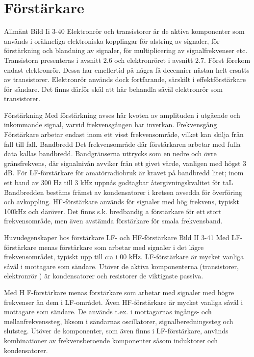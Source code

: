 \section{Förstärkare}

Allmänt
Bild Ii 3-40
Elektronrör och transistorer är de aktiva komponenter som används i oräkneliga elektroniska kopplingar för alstring av signaler, för
förstärkning och blandning av signaler, för
multiplicering av signalfrekvenser etc.
Transistorn presenteras i avsnitt 2.6 och
elektronröret i avsnitt 2.7.
Först förekom endast elektronrör. Dessa
har emellertid på några få decennier nästan
helt ersatts av transistorer. Elektronrör används dock fortfarande, särskilt i effektförstärkare för sändare. Det finns därför skäl att
här behandla såväl elektronrör som transistorer.

Förstärkning
Med förstärkning avses här kvoten av amplituden i utgående och inkommande signal,
varvid frekvensgången har inverkan.
Frekvensgång
Förstärkare arbetar endast inom ett visst
frekvensområde, vilket kan skilja från fall till
fall.
Bandbredd
Det frekvensområde där förstärkaren arbetar med fulla data kallas bandbredd. Bandgränserna uttrycks som en nedre och övre
gränsfrekvens, där signalnivån avviker från
ett givet värde, vanligen med högst 3 dB.
För LF-förstärkare för amatörradiobruk
är kravet på bandbredd litet; inom ett band
av 300 Hz till 3 kHz uppnås godtagbar
återgivningskvalitet för taL Bandbredden
bestäms främst av kondensatorer i kretsen
avsedda för överföring och avkoppling.
HF-förstärkare används för signaler med
hög frekvens, typiskt 100kHz och däröver.
Det finns s.k. bredbandig a förstärkare för ett
stort frekvensområde, men även avstämda
förstärkare för smala frekvensband.

Huvudegenskaper hos förstärkare
LF- och HF-förstärkare
Bild II 3-41
Med LF-förstärkare menas förstärkare som
arbetar med signaler i det lägre frekvensområdet, typiskt upp till c:a i 00 kHz. LF-förstärkare är mycket vanliga såväl i mottagare
som sändare. Utöver de aktiva komponenterna (transistorer, elektronrör ) är kondensatorer och resistorer de viktigaste passiva.

Med H F-förstärkare menas förstärkare som
arbetar med signaler med högre frekvenser
än dem i LF-området. Även HF-förstärkare
är mycket vanliga såväl i mottagare som
sändare. De används t.ex. i mottagarnas
ingångs- och mellanfrekvenssteg, liksom i
sändarnas oscillatorer, signalberedningssteg
och slutsteg.
Utöver de komponenter, som även finns
i LF-förstärkare, används kombinationer av
frekvensberoende komponenter såsom
induktorer och kondensatorer.

